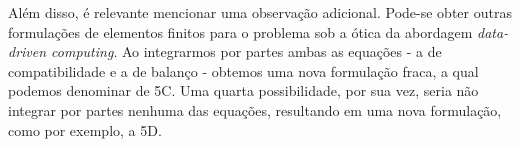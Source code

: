 Além disso, é relevante mencionar uma observação adicional. Pode-se obter outras formulações de elementos finitos para o problema sob a ótica da abordagem \textit{data-driven computing}. Ao integrarmos por partes ambas as equações - a de compatibilidade e a de balanço - obtemos uma nova formulação fraca, a qual podemos denominar de 5C. Uma quarta possibilidade, por sua vez, seria não integrar por partes nenhuma das equações, resultando em uma nova formulação, como por exemplo, a 5D.



